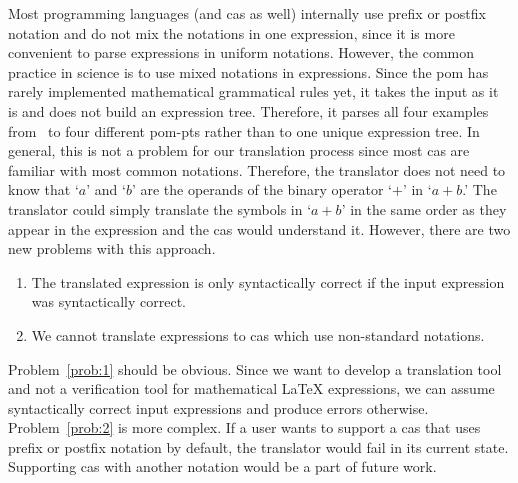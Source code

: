 \documentclass[a4paper,11pt]{article}
\theoremstyle{defTheoStyle}
\theoremstyle{defExampStyle}
\begin{document}
Most programming languages (and \gls*{cas} as well) internally use prefix or postfix notation and do not mix the notations in one expression, since it is more convenient to parse expressions in uniform notations. However, the common practice in science is to use mixed notations in expressions. Since the \gls*{pom} has rarely implemented mathematical grammatical rules yet, it takes the input as it is and does not build an expression tree. Therefore, it parses all four examples from~ to four different \gls*{pom-pt}s rather than to one unique expression tree. In general, this is not a problem for our translation process since most \gls*{cas} are familiar with most common notations. Therefore, the translator does not need to know that `$a$' and `$b$' are the operands of the binary operator `$+$' in `$a+b$.' The translator could simply translate the symbols in `$a+b$' in the same order as they appear in the expression and the \gls*{cas} would understand it. However, there are two new problems with this approach.
\begin{enumerate}\item \label{prob:1} The translated expression is only syntactically correct if the input expression was syntactically correct.
\item \label{prob:2} We cannot translate expressions to \gls*{cas} which use non-standard notations.
\end{enumerate}

Problem~\ref{prob:1} should be obvious. Since we want to develop a translation tool and not a verification tool for mathematical \LaTeX{} expressions, we can assume syntactically correct input expressions and produce errors otherwise. Problem~\ref{prob:2} is more complex. If a user wants to support a \gls*{cas} that uses prefix or postfix notation by default, the translator would fail in its current state. Supporting \gls*{cas} with another notation would be a part of future work.
\end{document}
